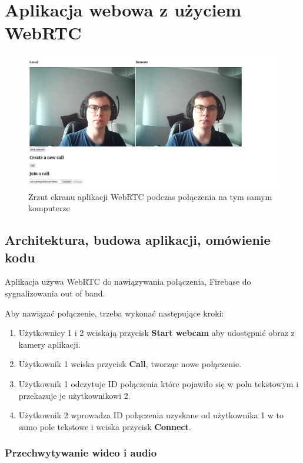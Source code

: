 \chapter{Aplikacja webowa z użyciem WebRTC}

\begin{figure}[htbp]
	\centering
	\includegraphics[width=\textwidth]{img/webrtc-app}
	\caption{Zrzut ekranu aplikacji WebRTC podczas połączenia na tym samym komputerze}
	\label{fig:webrtc_app}
\end{figure}

\section{Architektura, budowa aplikacji, omówienie kodu}

Aplikacja używa WebRTC do nawiązywania połączenia, Firebase do sygnalizowania out of band.

Aby nawiązać połączenie, trzeba wykonać następujące kroki:

\begin{enumerate}
	\item Użytkownicy 1 i 2 wciskają przycisk \textbf{Start webcam} aby udostępnić obraz z kamery aplikacji.
	\item Użytkownik 1 wciska przycisk \textbf{Call}, tworząc nowe połączenie.
	\item Użytkownik 1 odczytuje ID połączenia które pojawiło się w polu tekstowym i przekazuje je użytkownikowi 2.
	\item Użytkownik 2 wprowadza ID połączenia uzyskane od użytkownika 1 w to samo pole tekstowe i wciska przycisk
	      \textbf{Connect}.
\end{enumerate}

\subsection{Przechwytywanie wideo i audio}


